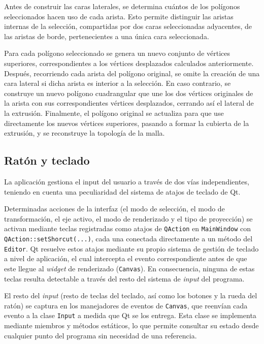 Antes de construir las caras laterales, se determina cuántos de los polígonos seleccionados hacen uso de cada arista. Esto permite distinguir las aristas internas de la selección, compartidas por dos caras seleccionadas adyacentes, de las aristas de borde, pertenecientes a una única cara seleccionada.

Para cada polígono seleccionado se genera un nuevo conjunto de vértices superiores, correspondientes a los vértices desplazados calculados anteriormente. Después, recorriendo cada arista del polígono original, se omite la creación de una cara lateral si dicha arista es interior a la selección. En caso contrario, se construye un nuevo polígono cuadrangular que une los dos vértices originales de la arista con sus correspondientes vértices desplazados, cerrando así el lateral de la extrusión. Finalmente, el polígono original se actualiza para que use directamente los nuevos vértices superiores, pasando a formar la cubierta de la extrusión, y se reconstruye la topología de la malla.

\subsection{Ratón y teclado} \label{sec:input}

La aplicación gestiona el input del usuario a través de dos vías independientes, teniendo en cuenta una peculiaridad del sistema de atajos de teclado de Qt.

Determinadas acciones de la interfaz (el modo de selección, el modo de transformación, el eje activo, el modo de renderizado y el tipo de proyección) se activan mediante teclas registradas como atajos de \texttt{QAction} en \texttt{MainWindow} con \texttt{QAction::setShorcut(...)}, cada una conectada directamente a un método del \texttt{Editor}. Qt resuelve estos atajos mediante su propio sistema de gestión de teclado a nivel de aplicación, el cual intercepta el evento correspondiente antes de que este llegue al \textit{widget} de renderizado (\texttt{Canvas}). En consecuencia, ninguna de estas teclas resulta detectable a través del resto del sistema de \textit{input} del programa.

El resto del \textit{input} (resto de teclas del teclado, así como los botones y la rueda del ratón) se captura en los manejadores de eventos de \texttt{Canvas}, que reenvían cada evento a la clase \texttt{Input} a medida que Qt se los entrega. Esta clase se implementa mediante miembros y métodos estáticos, lo que permite consultar su estado desde cualquier punto del programa sin necesidad de una referencia.

